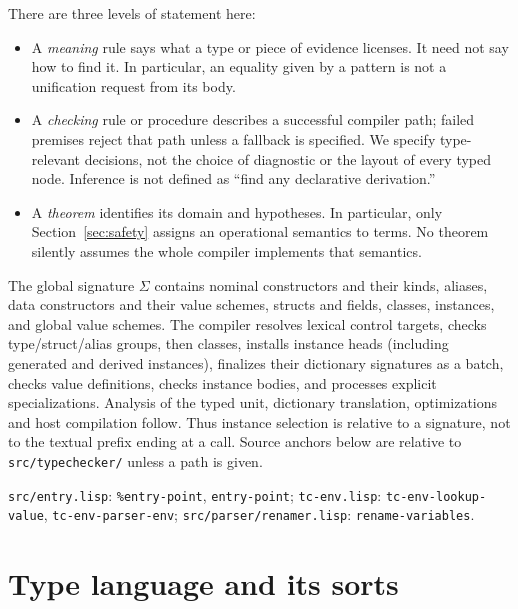 \documentclass[11pt]{article}
\theoremstyle{definition}
\newcommand{\code}[1]{\texttt{#1}}
\newcommand{\src}[1]{\nolinkurl{#1}}
\begin{document}
There are three levels of statement here:
\begin{itemize}
\item A \emph{meaning} rule says what a type or piece of evidence licenses.
It need not say how to find it. In particular, an equality given by a pattern
is not a unification request from its body.
\item A \emph{checking} rule or procedure describes a successful compiler path;
failed premises reject that path unless a fallback is specified. We specify
type-relevant decisions, not the choice of diagnostic or the layout of every
typed node. Inference is not defined as ``find any declarative derivation.''
\item A \emph{theorem} identifies its domain and hypotheses. In particular,
only Section~\ref{sec:safety} assigns an operational semantics to terms.
No theorem silently assumes the whole compiler implements that semantics.
\end{itemize}
The global signature $\Sigma$ contains nominal constructors and their kinds,
aliases, data constructors and their value schemes, structs and fields,
classes, instances, and global value schemes. The compiler resolves lexical
control targets, checks type/struct/alias groups, then classes, installs
instance heads (including generated and derived instances), finalizes their
dictionary signatures as a batch, checks value definitions, checks instance
bodies, and processes explicit specializations.
Analysis of the typed unit, dictionary translation, optimizations and host
compilation follow. Thus instance selection is relative to a signature, not
to the textual prefix ending at a call. Source anchors below are relative to
\src{src/typechecker/} unless a path is given.

\sources \src{src/entry.lisp}: \code{\%entry-point}, \src{entry-point};
\src{tc-env.lisp}: \src{tc-env-lookup-value}, \src{tc-env-parser-env};
\src{src/parser/renamer.lisp}: \src{rename-variables}.

\section{Type language and its sorts}\label{sec:types}
\end{document}
